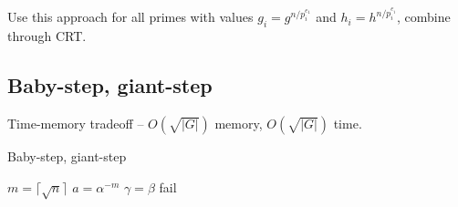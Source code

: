 Use this approach for all primes with values $g_i=g^{n/p_i^{e_1}}$ and $h_i=h^{n/p_i^{e_i}}$, combine through CRT.

\subsection*{Baby-step, giant-step}
Time-memory tradeoff -- $O(\sqrt{|G|})$ memory, $O(\sqrt{|G|})$ time.

\begin{algorithm}
	\caption{Baby-step, giant-step}
	$m=\lceil\sqrt{n}\rceil$\;
	$a=\alpha^{-m}$\;
	$\gamma = \beta$\;
	\Return fail
    \vspace{0.2cm}
\end{algorithm}



